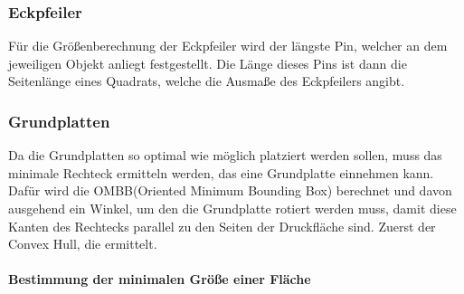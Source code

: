 \subsubsection{Eckpfeiler}
Für die Größenberechnung der Eckpfeiler wird der längste Pin, welcher an dem jeweiligen Objekt anliegt festgestellt.
Die Länge dieses Pins ist dann die Seitenlänge eines Quadrats, welche die Ausmaße des Eckpfeilers angibt.
\subsubsection{Grundplatten}
Da die Grundplatten so optimal wie möglich platziert werden sollen, muss das minimale Rechteck ermitteln werden, das eine Grundplatte einnehmen kann.
Dafür wird die OMBB(Oriented Minimum Bounding Box) berechnet und davon ausgehend ein Winkel, um den die Grundplatte rotiert werden muss, damit diese Kanten des Rechtecks parallel zu den Seiten der Druckfläche sind.
Zuerst der Convex Hull, die  ermittelt.
\paragraph{Bestimmung der minimalen Größe einer Fläche}